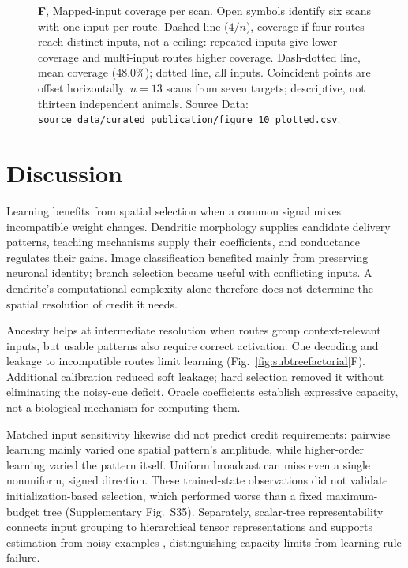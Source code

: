 \documentclass[11pt]{article}
\begin{document}
\begin{figure}[tbp]
{\textbf{F}, Mapped-input coverage per scan. Open symbols identify six scans with one input per route. Dashed line ($4/n$), coverage if four routes reach distinct inputs, not a ceiling: repeated inputs give lower coverage and multi-input routes higher coverage. Dash-dotted line, mean coverage (48.0\%); dotted line, all inputs. Coincident points are offset horizontally. $n=13$ scans from seven targets; descriptive, not thirteen independent animals.
Source Data: \texttt{source\_data/curated\_publication/figure\_10\_plotted.csv}.}
\label{fig:boundary}
\end{figure}

\section*{Discussion}

Learning benefits from spatial selection when a common signal mixes incompatible weight changes. Dendritic morphology supplies candidate delivery patterns, teaching mechanisms supply their coefficients, and conductance regulates their gains. Image classification benefited mainly from preserving neuronal identity; branch selection became useful with conflicting inputs. A dendrite's computational complexity alone therefore does not determine the spatial resolution of credit it needs.

Ancestry helps at intermediate resolution when routes group context-relevant inputs, but usable patterns also require correct activation. Cue decoding and leakage to incompatible routes limit learning (Fig.~\ref{fig:subtreefactorial}F). Additional calibration reduced soft leakage; hard selection removed it without eliminating the noisy-cue deficit. Oracle coefficients establish expressive capacity, not a biological mechanism for computing them.

Matched input sensitivity likewise did not predict credit requirements: pairwise learning mainly varied one spatial pattern's amplitude, while higher-order learning varied the pattern itself. Uniform broadcast can miss even a single nonuniform, signed direction. These trained-state observations did not validate initialization-based selection, which performed worse than a fixed maximum-budget tree (Supplementary Fig.~S35). Separately, scalar-tree representability connects input grouping to hierarchical tensor representations and supports estimation from noisy examples \citep{hackbusch2009tensor,grasedyck2010hierarchical,cohen2016tensor}, distinguishing capacity limits from learning-rule failure.
\end{document}
